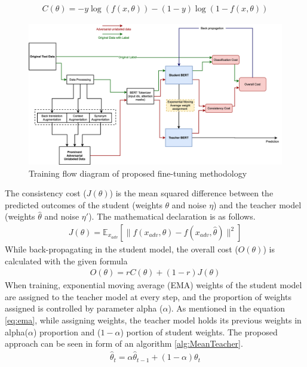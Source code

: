 \documentclass[%
	BCOR=8mm, %
	DIV=12,
	toc=bibliography, %
	toc=listof, %
	oneside, %
	egregdoesnotlikesansseriftitles, %
	]{scrbook}
\begin{document}
\begin{equation}
    \begin{aligned}
        C( \theta )=-y \log (f(x,\theta))-(1-y) \log(1-f(x,\theta))
        \label{eq:classification_cost}
    \end{aligned}
\end{equation}
 \begin{figure}[h!]
    \centering
    \includegraphics[width=1.1\textwidth]{img/Methodology.png}
    \caption[Training flow diagram of proposed fine-tuning approach]{Training flow diagram of proposed fine-tuning methodology }
    \label{diag:advMTBERT}
\end{figure}
The consistency cost ($J(\theta)$)  is the mean squared difference between the predicted outcomes of the student (weights $\theta$ and noise $\eta$) and the teacher model (weights $\hat\theta$ and noise $\eta'$).  The mathematical declaration is as follows. 
\begin{equation}
    \begin{aligned}
        J( \theta )=\mathbb{E}_{x_{adv}}[\|f(x_{adv},\theta)-f(x_{adv},\hat\theta)\|^2]
        \label{eq:ADVconsistencycost}
    \end{aligned}
\end{equation}
While back-propagating in the student model, the overall cost ($\textit{O}(\theta)$) is calculated with the given formula 
 \begin{equation}
     \begin{aligned}
         \textit{O}(\theta)= r C(\theta)+(1-r)J(\theta)
         \label{eq:overallcost}
         \end{aligned}
   \end{equation}
   When training, exponential moving average (EMA) weights of the student model are assigned to the teacher model at every step, and the proportion of weights assigned is controlled by parameter alpha ($\alpha$). As mentioned in the equation \ref{eq:ema}, while assigning weights, the teacher model holds its previous weights in alpha($\alpha$) proportion and ($1-\alpha$) portion of student weights. The proposed approach can be seen in form of an algorithm \ref{alg:MeanTeacher}.
 \begin{equation}
     \begin{aligned}
         \hat\theta_t= \alpha\hat\theta_{t-1}+(1-\alpha)\theta_t
         \label{eq:ema}
         \end{aligned}
  \end{equation}
\end{document}
